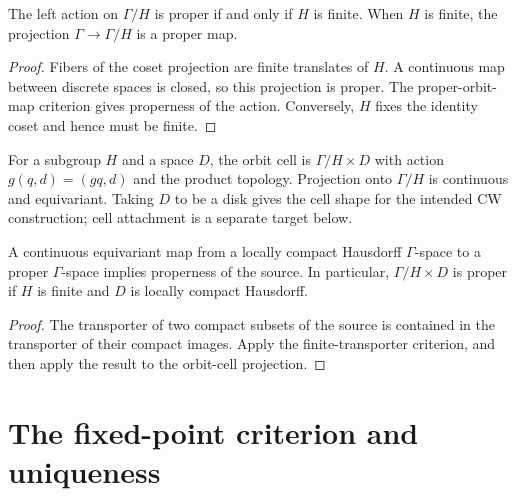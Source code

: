 \begin{proposition}\label{prop:proper-homogeneous-orbits}
The left action on $\Gamma/H$ is proper if and only if $H$ is finite.
When $H$ is finite, the projection $\Gamma\to\Gamma/H$ is a proper map.
\end{proposition}
\begin{proof}
\leanok
Fibers of the coset projection are finite translates of $H$. A continuous
map between discrete spaces is closed, so this projection is proper.
The proper-orbit-map criterion gives properness of the action.
Conversely, $H$ fixes the identity coset and hence must be finite.
\end{proof}

\begin{definition}\label{def:orbit-cell}
\leanok
For a subgroup $H$ and a space $D$, the orbit cell is
$\Gamma/H\times D$ with action $g(q,d)=(gq,d)$ and the product topology.
Projection onto $\Gamma/H$ is continuous and equivariant.
Taking $D$ to be a disk gives the cell shape for the intended CW construction;
cell attachment is a separate target below.
\end{definition}

\begin{proposition}\label{prop:proper-orbit-cells}
A continuous equivariant map from a locally compact Hausdorff
$\Gamma$-space to a proper $\Gamma$-space implies properness of the source.
In particular, $\Gamma/H\times D$ is proper if $H$ is finite and $D$ is
locally compact Hausdorff.
\end{proposition}
\begin{proof}
\leanok
The transporter of two compact subsets of the source is contained in
the transporter of their compact images. Apply the finite-transporter
criterion, and then apply the result to the orbit-cell projection.
\end{proof}

\section{The fixed-point criterion and uniqueness}

